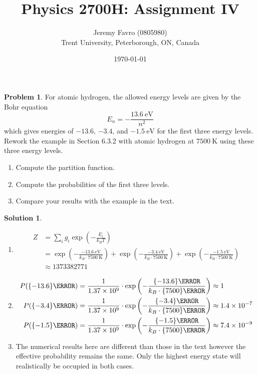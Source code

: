 \documentclass[10pt]{article}
\title{Physics 2700H: Assignment IV}
\author{Jeremy Favro (0805980) \\ Trent University, Peterborough, ON, Canada}
\date{\today}
\theoremstyle{definition}
\newtheorem{problem}{Problem}
\newtheorem{soln}{Solution}
\begin{document}
\maketitle
\begin{problem}
For atomic hydrogen, the allowed energy levels are given by the Bohr equation
$$E_n=-\frac{\qty{13.6}{\electronvolt}}{n^2}$$
which gives energies of $-13.6$, $-3.4$, and $\qty{-1.5}{\electronvolt}$ for the first three energy levels.
Rework the example in Section 6.3.2 with atomic hydrogen at $\qty{7500}{\kelvin}$ using these three energy levels.
\begin{enumerate}[label=(\alph*)]
  \item Compute the partition function.
  \item Compute the probabilities of the first three levels.
  \item Compare your results with the example in the text.
\end{enumerate}
\end{problem}
\begin{soln}~
  \begin{enumerate}[label=(\alph*)]
    \item \begin{align*}
            Z & =\sum_{i}g_i\exp\left(-\frac{E_i}{k_BT}\right)                                          \\
              & =\exp\left(-\frac{\qty{-13.6}{\electronvolt}}{k_B\cdot\qty{7500}{\kelvin}}\right)+
            \exp\left(-\frac{\qty{-3.4}{\electronvolt}}{k_B\cdot\qty{7500}{\kelvin}}\right)+
            \exp\left(-\frac{\qty{-1.5}{\electronvolt}}{k_B\cdot\qty{7500}{\kelvin}}\right)             \\
              & \approx \num[round-mode=figures,round-precision=3,scientific-notation=true]{1373382771}
          \end{align*}
    \item \begin{align*}
            P(\qty{-13.6}{\electronvolt}) & =
            \frac{1}{\num[round-mode=figures,round-precision=3,scientific-notation=true]{1373382771}}\cdot\exp
            \left(-\frac{\qty{-13.6}{\electronvolt}}{k_B\cdot\qty{7500}{\kelvin}}\right)\approx 1           \\
            P(\qty{-3.4}{\electronvolt})  & =
            \frac{1}{\num[round-mode=figures,round-precision=3,scientific-notation=true]{1373382771}}\cdot\exp
            \left(-\frac{\qty{-3.4}{\electronvolt}}{k_B\cdot\qty{7500}{\kelvin}}\right)\approx \num{1.4d-7} \\
            P(\qty{-1.5}{\electronvolt})  & =
            \frac{1}{\num[round-mode=figures,round-precision=3,scientific-notation=true]{1373382771}}\cdot\exp
            \left(-\frac{\qty{-1.5}{\electronvolt}}{k_B\cdot\qty{7500}{\kelvin}}\right)\approx \num{7.4d-9}
          \end{align*}
    \item The numerical results here are different than those in the text however the effective probability remains the same. Only the highest energy state
          will realistically be occupied in both cases.
  \end{enumerate}
\end{soln}
\newpage
\end{document}
